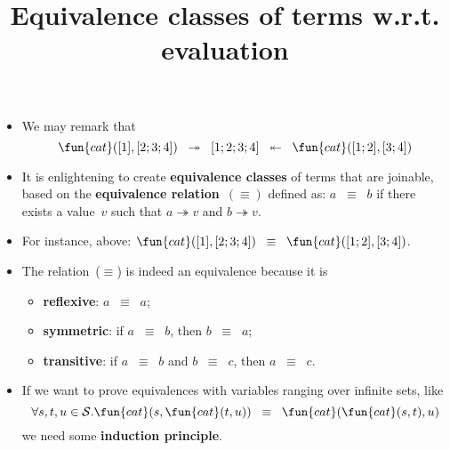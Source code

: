 \documentclass[wide]{slides}
\begin{document}
\begin{slide}
  \title{Equivalence classes of terms w.r.t. evaluation}

  \begin{itemize}

    \item We may remark that
      \begin{equation*}
        \fun{cat}([1], [2;3;4]) \;\; \twoheadrightarrow \;\; [1;2;3;4]
        \;\; \twoheadleftarrow \;\; \fun{cat}([1;2], [3;4])
      \end{equation*}

    \item It is enlightening to create \textbf{equivalence classes} of
      terms that are joinable, based on the \textbf{equivalence
        relation}~\((\equiv)\) defined as: \(a \;\; \equiv \;\; b\) if
      there exists a value~\(v\) such that \(a \twoheadrightarrow v\)
      and \(b \twoheadrightarrow v\).

    \item For instance, above: \(\fun{cat}([1], [2;3;4]) \;\; \equiv
      \;\; \fun{cat}([1;2], [3;4])\).

    \item The relation~(\(\equiv\)) is indeed an equivalence because
      it is
      \begin{itemize}

        \item \textbf{reflexive}: \(a \;\; \equiv \;\; a\);

        \item \textbf{symmetric}: if \(a \;\; \equiv \;\; b\), then
          \(b \;\; \equiv \;\; a\);

        \item \textbf{transitive}: if \(a \;\; \equiv \;\; b\) and \(b
          \;\; \equiv \;\; c\), then \(a \;\; \equiv \;\; c\).

      \end{itemize}

      \item If we want to prove equivalences with variables ranging
        over infinite sets, like
        \begin{equation*}
          \forall s,t,u \in \mathcal{S}. \fun{cat}(s,\fun{cat}(t,u))
          \;\; \equiv \;\; \fun{cat}(\fun{cat}(s,t),u)
        \end{equation*}
        we need some \textbf{induction principle}.

  \end{itemize}

\end{slide}
\end{document}
